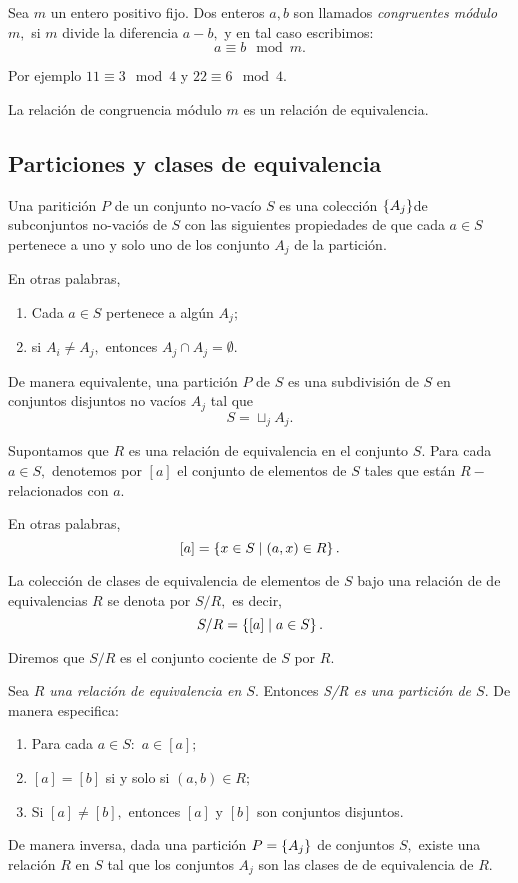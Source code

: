 	\label{lip:exmp:2.12.c}
	Sea $m$ un entero positivo fijo. Dos enteros $a,b$ son llamados \emph{congruentes módulo $m,$} si $m$ divide la diferencia $a-b,$ y en tal caso escribimos:
	$$
	a\equiv b \mod m.
	$$


	Por ejemplo $11\equiv 3 \mod 4$ y $22\equiv 6 \mod 4.$


	La relación de congruencia módulo $m$ es un relación de equivalencia.



\subsection{Particiones y clases de equivalencia}


	Una paritición $P$ de un conjunto no-vacío $S$ es una colección $\left\{ A_{j} \right\}$de subconjuntos no-vaciós de $S$ con las siguientes propiedades de que cada $a\in S$ pertenece a uno y solo uno de los conjunto $A_{j}$ de la partición.

	En otras palabras,
	\begin{enumerate}
		\item Cada $a\in S$ pertenece a algún $A_{j};$
		\item si $A_{i}\neq A_{j},$ entonces $A_{j}\cap A_{j}=\emptyset.$

	\end{enumerate}


	De manera equivalente, una partición $P$ de $S$ es una subdivisión de $S$ en conjuntos disjuntos no vacíos $A_{j}$ tal que $$S= \sqcup_{j} A_{j}.$$



	Supontamos que $R$ es una relación de equivalencia en el conjunto $S.$ Para cada $a\in S,$ denotemos por $[a]$ el conjunto de elementos de $S$ tales que están $R-$relacionados con $a.$


	En otras palabras,
	$$
	[a]=\left\{ x \in S \mid (a,x)\in R \right\}.
	$$



	La colección de clases de equivalencia de elementos de $S$ bajo una relación de de equivalencias $R$ se denota por $S/R,$ es decir,
	$$
	S/R=\left\{ [a] \mid a \in S \right\}.
	$$


	Diremos que $S/R$ es el conjunto cociente de $S$ por $R.$



	\begin{teorema}
		\label{lip:thm:2.6}
		Sea \emph{$R$ una relación de equivalencia en $S.$} Entonces \emph{S/R es una partición de $S.$}
		De manera especifica:
		\begin{enumerate}
			\item Para cada $a \in S:$  $a\in [a];$
			\item $[a]=[b]$ si y solo si $(a,b)\in R;$
			\item Si $[a]\neq [b],$ entonces $[a]$ y $[b]$ son conjuntos disjuntos.
		\end{enumerate}


		De manera inversa, dada una partición $P=\left\{ A_{j} \right\}$ de conjuntos $S,$ existe una relación $R$ en $S$ tal que los conjuntos $A_{j}$ son las clases de de equivalencia de $R.$
	\end{teorema}




